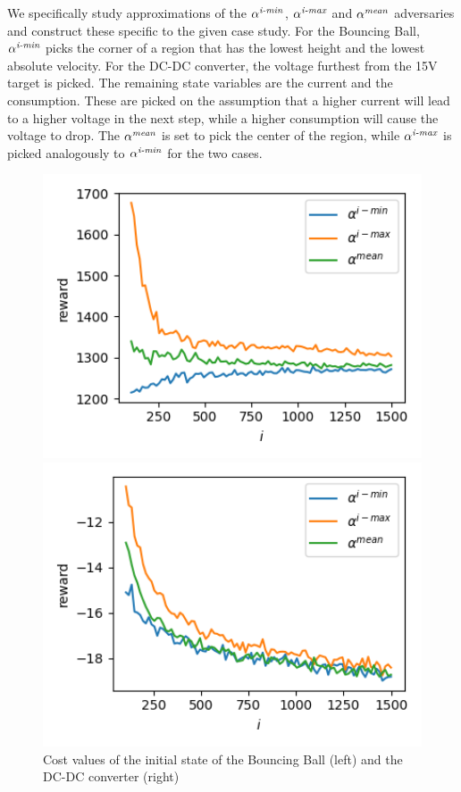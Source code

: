 \documentclass{llncs}
\begin{document}
We specifically study approximations of the $\alpha^{\emph{i-min}}$, $\alpha^{\emph{i-max}}$ and $\alpha^{\emph{mean}}$ adversaries and 
construct these specific to the given case study.
For the Bouncing Ball, $\alpha^{\emph{i-min}}$ picks the corner of a region
that has the lowest height and the lowest absolute velocity.
For the DC-DC converter, the voltage furthest from the 15V target is picked.
The remaining state variables are the current and the consumption.
These are picked on the assumption that a higher current will lead to a higher voltage in the next step,
while a higher consumption will cause the voltage to drop.
The $\alpha^{\emph{mean}}$ is set to pick the center of the region, while $\alpha^{\emph{i-max}}$ is picked analogously to $\alpha^{\emph{i-min}}$
for the two cases.

\begin{figure}[t]
\begin{minipage}{0.45\linewidth}
\includegraphics[width=1\textwidth]{./Figures/BB.png}
\end{minipage}
\begin{minipage}{0.45\linewidth}
\includegraphics[width=1\textwidth]{./Figures/DC.png}
\end{minipage}
\caption{Cost values of the initial state of the Bouncing Ball (left) and the DC-DC converter (right)}
\label{fig:casestudies}
\end{figure}
\end{document}
